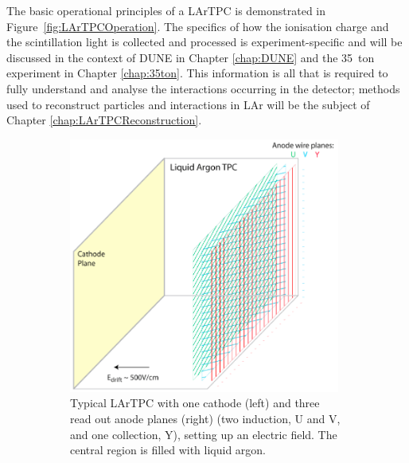 The basic operational principles of a LArTPC is demonstrated in Figure~\ref{fig:LArTPCOperation}.  The specifics of how the ionisation charge and the scintillation light is collected and processed is experiment-specific and will be discussed in the context of DUNE in Chapter \ref{chap:DUNE} and the 35~ton experiment in Chapter \ref{chap:35ton}.  This information is all that is required to fully understand and analyse the interactions occurring in the detector; methods used to reconstruct particles and interactions in LAr will be the subject of Chapter \ref{chap:LArTPCReconstruction}.

\begin{figure}[p]
  \centering
  \begin{subfigure}[t]{0.48\linewidth}
    \centering
    \includegraphics[width=0.98\textwidth]{LArTPCOperation1.png}
    \caption{Typical LArTPC with one cathode (left) and three read out anode planes (right) (two induction, U and V, and one collection, Y), setting up an electric field.  The central region is filled with liquid argon.}
    \label{fig:LArTPCOperation1}
  \end{subfigure}
  \hfill
  \begin{subfigure}[t]{0.48\linewidth}
    \centering

\end{subfigure}
\end{figure}
